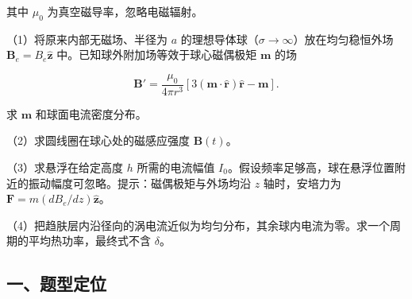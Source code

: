 \documentclass[12pt,a4paper,fontset=fandol]{ctexart}
\begin{document}
其中 \(\mu_0\) 为真空磁导率，忽略电磁辐射。

\begin{center}
\begin{minipage}{\linewidth}
\centering\begingroup{}
\ifdim\wd\diagrambox>.88\linewidth
\sbox{\diagrambox}{\resizebox{.88\linewidth}{!}{\usebox{\diagrambox}}}\fi
\ifdim\ht\diagrambox>.38\textheight
\resizebox{!}{.38\textheight}{\usebox{\diagrambox}}
\else\usebox{\diagrambox}\fi
\par{}\endgroup\end{minipage}\end{center}

（1）将原来内部无磁场、半径为 \(a\)
的理想导体球（\(\sigma\to\infty\)）放在均匀稳恒外场
\(\boldsymbol B_e=B_e\hat{\boldsymbol z}\)
中。已知球外附加场等效于球心磁偶极矩 \(\boldsymbol m\) 的场

\[\boldsymbol B'=\frac{\mu_0}{4\pi r^3}
[3(\boldsymbol m\cdot\hat{\boldsymbol r})\hat{\boldsymbol r}-\boldsymbol m].\]

求 \(\boldsymbol m\) 和球面电流密度分布。

（2）求圆线圈在球心处的磁感应强度 \(\boldsymbol B(t)\)。

（3）求悬浮在给定高度 \(h\) 所需的电流幅值
\(I_0\)。假设频率足够高，球在悬浮位置附近的振动幅度可忽略。提示：磁偶极矩与外场均沿
\(z\) 轴时，安培力为 \(\boldsymbol F=m(dB_e/dz)\hat{\boldsymbol z}\)。

（4）把趋肤层内沿径向的涡电流近似为均匀分布，其余球内电流为零。求一个周期的平均热功率，最终式不含
\(\delta\)。

\subsection{一、题型定位}\label{ux4e00ux9898ux578bux5b9aux4f4d-5}
\end{document}
